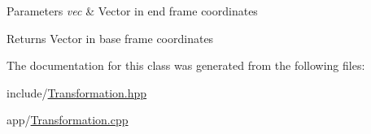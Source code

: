 \begin{DoxyParams}{Parameters}
{\em vec} & Vector in end frame coordinates\\
\hline
\end{DoxyParams}
\begin{DoxyReturn}{Returns}
Vector in base frame coordinates 
\end{DoxyReturn}


The documentation for this class was generated from the following files\+:\begin{DoxyCompactItemize}
\item 
include/\hyperlink{Transformation_8hpp}{Transformation.\+hpp}\item 
app/\hyperlink{Transformation_8cpp}{Transformation.\+cpp}\end{DoxyCompactItemize}
